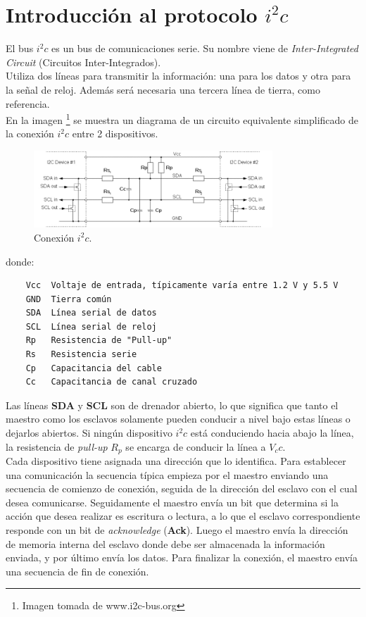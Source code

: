 \documentclass[main]{subfiles}
\begin{document}
\newpage
\section{Introducción al protocolo $i^2c$}

El bus $i^2c$ es un bus de comunicaciones serie. Su nombre viene de \emph{Inter-Integrated Circuit} (Circuitos Inter-Integrados).\\
Utiliza dos líneas para transmitir la información: una para los datos y otra para la señal de reloj. Además será necesaria una tercera línea de tierra, como referencia.\\
En la imagen \label{fig:setup}\footnote{Imagen tomada de www.i2c-bus.org} se muestra un diagrama de un circuito equivalente simplificado de la conexión $i^2c$ entre 2 dispositivos.

\begin{figure}[h!]
	\centering
	\includegraphics[width=0.8\textwidth]{./pics_sniffer/setup.jpg}
	\caption{Conexión $i^2c$.}
	\label{fig:setup}
\end{figure}
donde:
\begin{verbatim}
	Vcc	 Voltaje de entrada, típicamente varía entre 1.2 V y 5.5 V
	GND	 Tierra común
	SDA	 Línea serial de datos
	SCL	 Línea serial de reloj
	Rp 	 Resistencia de "Pull-up"
	Rs 	 Resistencia serie
	Cp 	 Capacitancia del cable
	Cc 	 Capacitancia de canal cruzado
\end{verbatim}

Las líneas \textbf{SDA} y \textbf{SCL} son de drenador abierto, lo que significa que tanto el maestro como los esclavos solamente pueden conducir a nivel bajo estas líneas o dejarlos abiertos. Si ningún dispositivo $i^2c$ está conduciendo hacia abajo la línea, la resistencia de \emph{pull-up} $R_p$ se encarga de conducir la línea a $V_cc$.\\

Cada dispositivo tiene asignada una dirección que lo identifica. Para establecer una comunicación la secuencia típica empieza por el maestro enviando una secuencia de comienzo de conexión, seguida de la dirección del esclavo con el cual desea comunicarse. Seguidamente el maestro envía un bit que determina si la acción que desea realizar es escritura o lectura, a lo que el esclavo correspondiente responde con un bit de \emph{acknowledge} (\textbf{Ack}). Luego el maestro envía la dirección de memoria interna del esclavo donde debe ser almacenada la información enviada, y por último envía los datos. Para finalizar la conexión, el maestro envía una secuencia de fin de conexión.
\end{document}
